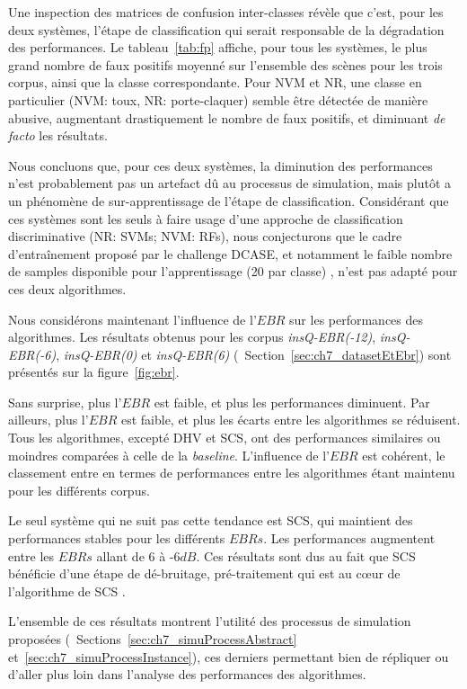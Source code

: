 Une inspection des matrices de confusion inter-classes révèle que c'est, pour les deux systèmes, l'étape de classification qui serait responsable de la dégradation des performances. Le tableau~\ref{tab:fp} affiche, pour tous les systèmes, le plus grand nombre de faux positifs moyenné sur l'ensemble des scènes pour les trois corpus, ainsi que la classe correspondante. Pour NVM et NR, une classe en particulier (NVM: toux, NR: porte-claquer) semble être détectée de manière abusive, augmentant drastiquement le nombre de faux positifs, et diminuant \emph{de facto} les résultats.

Nous concluons que, pour ces deux systèmes, la diminution des performances n'est probablement pas un artefact dû au processus de simulation, mais plutôt a un phénomène de sur-apprentissage de l'étape de classification. Considérant que ces systèmes sont les seuls à faire usage d'une approche de classification discriminative (NR: SVMs; NVM: RFs), nous conjecturons que le cadre d'entraînement proposé par le challenge DCASE, et notamment le faible nombre de samples disponible pour l'apprentissage (20 par classe) , n'est pas adapté pour ces deux algorithmes.

Nous considérons maintenant l'influence de l'$EBR$ sur les performances des algorithmes. Les résultats obtenus pour les corpus \emph{insQ-EBR(-12)}, \emph{insQ-EBR(-6)}, \emph{insQ-EBR(0)} et \emph{insQ-EBR(6)} (\cf~Section~\ref{sec:ch7_datasetEtEbr}) sont présentés sur la figure~\ref{fig:ebr}. 

Sans surprise, plus l'$EBR$ est faible, et plus les performances diminuent. Par ailleurs, plus l'$EBR$ est faible, et plus les  écarts entre les algorithmes se réduisent. Tous les algorithmes, excepté DHV et SCS, ont des performances similaires ou moindres comparées à celle de la \emph{baseline}. L'influence de l'$EBR$ est cohérent, le classement entre en termes de performances entre les algorithmes étant maintenu pour les différents corpus. 

Le seul système qui ne suit pas cette tendance est SCS, qui maintient des performances stables pour les différents $EBRs$. Les performances augmentent entre les $EBRs$ allant de 6 à -6$dB$. Ces résultats sont dus au fait que SCS bénéficie d'une  étape de dé-bruitage, pré-traitement qui est au cœur de l'algorithme de SCS \citep{SCS}.

L'ensemble de ces résultats montrent l'utilité des processus de simulation proposées (\cf~Sections~\ref{sec:ch7_simuProcessAbstract} et~\ref{sec:ch7_simuProcessInstance}), ces derniers permettant bien de répliquer ou d'aller plus loin dans l'analyse des performances des algorithmes.

